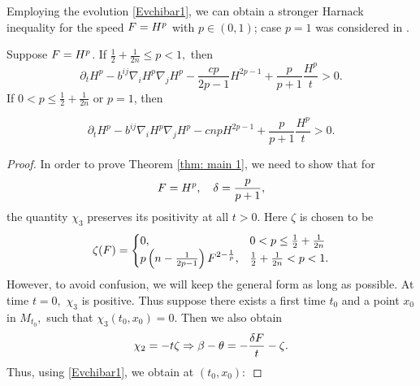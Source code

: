 \documentclass{amsart}
\begin{document}
Employing the evolution \cref{Evchibar1}, we can obtain a stronger Harnack inequality for the speed \(F = H^{p}\) with \(p \in (0,1)\); case $p=1$ was considered in \cite{BryanIvaki:08/2015}.
\begin{theorem} \label{thm: main 1}
Suppose \(F = H^{p}\). If $\frac{1}{2}+\frac{1}{2n}\leq {p}< 1,$ then
\[
\partial_t H^{p} - b^{ij}\nabla_iH^{p}\nabla_jH^{p} - \frac{c {p}}{2{p}-1}H^{2{p}-1} + \frac{{p}}{{p}+1} \frac{H^{p}}{t} > 0.
\]
If $0<{p}\leq \frac{1}{2} + \frac{1}{2n}$ or $p=1$, then

\[
\partial_t H^{p} - b^{ij}\nabla_iH^{p}\nabla_jH^{p} - c n{p}H^{2{p}-1} + \frac{{p}}{{p}+1} \frac{H^{p}}{t} > 0.
\]
\end{theorem}
\begin{proof}
In order to prove Theorem \ref{thm: main 1}, we need to show that for
$$F=H^{p},\quad \delta=\frac{p}{p+1},$$
the quantity $\chi_3$ preserves its positivity at all $t>0.$ Here $\zeta$ is chosen to be
$$\zeta(F)=\begin{cases} 0, &0<p\leq \frac{1}{2}+\frac{1}{2n}\\
                    p\left(n-\frac{1}{2p-1}\right)F^{2-\frac{1}{p}}, &\frac{1}{2}+\frac{1}{2n}<p< 1.\end{cases}$$
However, to avoid confusion, we will keep the general form as long as possible.
At time $t=0,$ $\chi_3$ is positive.
Thus suppose there exists a first time $t_0$ and a point $x_0$ in $M_{t_0},$ such that $\chi_3(t_0,x_0)=0.$
Then we also obtain
$$\chi_2=-t\zeta\Rightarrow \beta-\theta=-\frac{\delta F}{t}-\zeta.$$
Thus, using \eqref{Evchibar1}, we obtain at $(t_0,x_0)\colon$


\end{proof}
\end{document}

